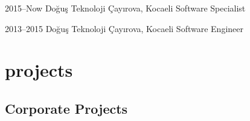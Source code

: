 \documentclass[]{../friggeri-cv} %
\begin{document}
\begin{entrylist}

\entry
{2015--Now}
{Doğuş Teknoloji}
{Çayırova, Kocaeli}
{Software Specialist}

\entry
{2013--2015}
{Doğuş Teknoloji}
{Çayırova, Kocaeli}
{Software Engineer}

\end{entrylist}

\section{projects}

\subsection{Corporate Projects}
\end{document}
